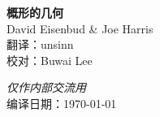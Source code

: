 \documentclass[11pt,svgnames]{book}
\begin{document}
\begin{titlepage}
	\begin{flushright}
	{\Huge\bfseries 概形的几何}\\[\baselineskip]
	David Eisenbud \& Joe Harris \\
	翻译：unsinn \\
	校对：Buwai Lee 
	\end{flushright}
	\vfill
	{\Large\itshape 仅作内部交流用}\\
	\noindent 编译日期：\today
\end{titlepage}
\clearpage
\frontmatter
\pagestyle{plain}
\tableofcontents
\mainmatter
\pagestyle{headings}
	
	
	
	
	
	
	
\backmatter
	
\printindex
\end{document}
